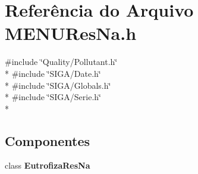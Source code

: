 \section{Referência do Arquivo M\+E\+N\+U\+Res\+Na.\+h}
\label{_m_e_n_u_res_na_8h}
{\ttfamily \#include \char`\"{}Quality/\+Pollutant.\+h\char`\"{}}\\*
{\ttfamily \#include \char`\"{}S\+I\+G\+A/\+Date.\+h\char`\"{}}\\*
{\ttfamily \#include \char`\"{}S\+I\+G\+A/\+Globals.\+h\char`\"{}}\\*
{\ttfamily \#include \char`\"{}S\+I\+G\+A/\+Serie.\+h\char`\"{}}\\*
\subsection*{Componentes}
\begin{DoxyCompactItemize}
\item 
class {\bf Eutrofiza\+Res\+Na}
\end{DoxyCompactItemize}
